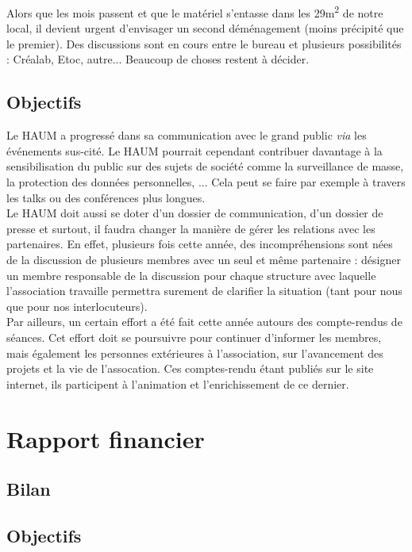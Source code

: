 \documentclass[11pt]{article}
\begin{document}
Alors que les mois passent et que le matériel s'entasse dans les 29m\textsuperscript{2} de notre local, il devient
urgent d'envisager un second déménagement (moins précipité que le premier). Des discussions sont en cours entre le bureau et plusieurs
possibilités : Créalab, Etoc, autre... Beaucoup de choses restent à décider.

\subsection{Objectifs}

Le HAUM a progressé dans sa communication avec le grand public \textit{via} les événements sus-cité. Le HAUM pourrait cependant contribuer davantage à la sensibilisation du public sur
des sujets de société comme la surveillance de masse, la protection des données personnelles, ... Cela peut se faire par exemple à travers les talks ou des conférences plus longues.\\



Le HAUM doit aussi se doter d'un dossier de communication, d'un dossier
de presse et surtout, il faudra changer la manière de gérer les relations avec les partenaires.
En effet, plusieurs fois cette année, des incompréhensions sont nées de la discussion de plusieurs membres avec un seul
et même partenaire : désigner un membre responsable de la discussion pour chaque structure avec laquelle l'association
travaille permettra surement de clarifier la situation (tant pour nous que pour nos interlocuteurs).\\
Par ailleurs, un certain effort a \'et\'e fait cette ann\'ee autours des compte-rendus de s\'eances. Cet effort doit se poursuivre pour continuer d'informer les membres, mais \'egalement les personnes ext\'erieures \`a l'association, sur l'avancement des projets et la vie de l'assocation. Ces comptes-rendu \'etant publi\'es sur le site internet, ils participent \`a l'animation et l'enrichissement de ce dernier.

\section{Rapport financier}

\subsection{Bilan}

\subsection{Objectifs}
\end{document}
